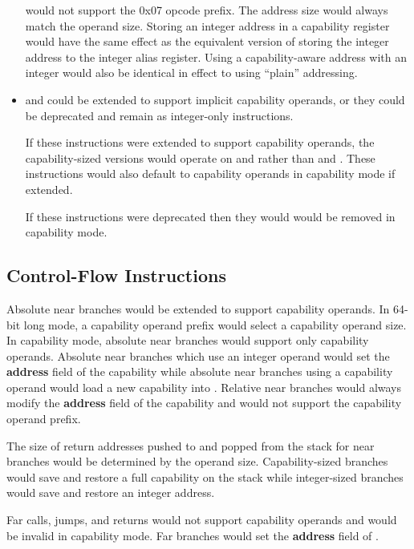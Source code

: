 \begin{itemize}
     would not support the 0x07 opcode prefix.  The
    address size would always match the operand size.  Storing an
    integer address in a capability register would have the same
    effect as the equivalent version of  storing the
    integer address to the integer alias register.  Using a
    capability-aware address with an integer  would
    also be identical in effect to using ``plain'' addressing.

  \item {} and  could be extended to
    support implicit capability operands, or they could be deprecated
    and remain as integer-only instructions.

    If these instructions were extended to support capability
    operands, the capability-sized versions would operate on \CSP{}
    and \CBP{} rather than \RSP{} and \RBP{}.  These instructions
    would also default to capability operands in capability mode
    if extended.

    If these instructions were deprecated then they would would be
    removed in capability mode.
\end{itemize}

\subsection{Control-Flow Instructions}

Absolute near branches would be extended to support capability operands.
In 64-bit long mode, a capability operand prefix would select a
capability operand size.  In capability mode, absolute near branches would
support only capability operands.
Absolute near branches which use an integer operand would set the
\textbf{address} field of the
\CIP{} capability while absolute near branches using a capability operand would
load a new capability into \CIP{}.
Relative near branches would always modify the \textbf{address} field of the \CIP{}
capability and would not support the capability operand prefix.

The size of return addresses pushed to and popped from the
stack for near branches would be determined by the operand size.
Capability-sized branches would save and restore a full capability on
the stack while integer-sized branches would save and restore an
integer address.

Far calls, jumps, and returns would not support capability operands
and would be invalid in capability mode.
Far branches would
set the \textbf{address} field of \CIP{}.


